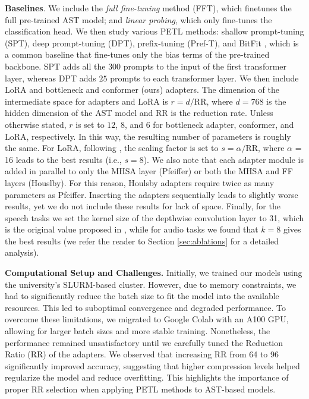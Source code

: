 \documentclass[11pt]{article}
\begin{document}
\textbf{Baselines}. We include the \textit{full fine-tuning} method (FFT), which finetunes the full pre-trained AST model; and \textit{linear probing}, which only fine-tunes the classification head. We then study various PETL methods: shallow prompt-tuning (SPT), deep prompt-tuning (DPT), prefix-tuning (Pref-T), and BitFit \cite{zaken2021bitfit}, which is a common baseline that fine-tunes only the bias terms of the pre-trained
backbone. SPT adds all the $300$ prompts to the input of the first transformer layer, whereas DPT adds $25$ prompts to each transformer layer. We then include LoRA and bottleneck and conformer (ours) adapters. The dimension of the intermediate space for adapters and LoRA is $r = d/\text{RR}$, where $d = 768$ is the hidden dimension of the AST model and RR is the reduction rate. Unless otherwise stated, $r$ is set to $12$, $8$, and $6$ for bottleneck adapter, conformer, and LoRA, respectively. In this way, the resulting number of parameters is roughly the same. For LoRA, following \cite{hu2021lora}, the scaling factor is set to $s = \alpha/\text{RR}$, where $\alpha$ = 16 leads to the best results (i.e., $s = 8$). We also note that each adapter module is added in parallel to only the MHSA layer (Pfeiffer) or both the MHSA and FF layers (Houslby). For this reason, Houlsby adapters require twice as many parameters as Pfeiffer. Inserting the adapters sequentially leads to slightly worse results, yet we do not include these results for lack of space. Finally, for the speech tasks we set the kernel size of the depthwise convolution layer to 31, which is the original value proposed in \cite{conformer}, while for audio tasks we found that $k = 8$ gives the best results (we refer the reader to Section \ref{sec:ablations} for a detailed analysis). 

\textbf{Computational Setup and Challenges.} Initially, we trained our models using the university's SLURM-based cluster. However, due to memory constraints, we had to significantly reduce the batch size to fit the model into the available resources. This led to suboptimal convergence and degraded performance. To overcome these limitations, we migrated to Google Colab with an A100 GPU, allowing for larger batch sizes and more stable training. Nonetheless, the performance remained unsatisfactory until we carefully tuned the Reduction Ratio (RR) of the adapters. We observed that increasing RR from 64 to 96 significantly improved accuracy, suggesting that higher compression levels helped regularize the model and reduce overfitting. This highlights the importance of proper RR selection when applying PETL methods to AST-based models.
\end{document}
